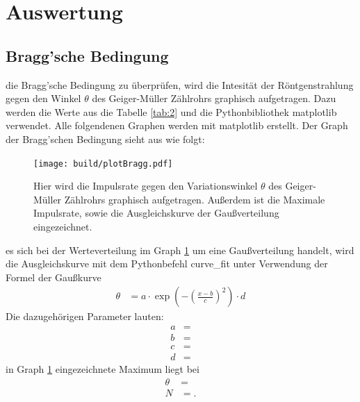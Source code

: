 \section{Auswertung}

\subsection{Bragg'sche Bedingung}

    \justifying die Bragg'sche Bedingung zu überprüfen, wird die Intesität der Röntgenstrahlung gegen den Winkel $\theta$ des
    Geiger-Müller Zählrohrs graphisch aufgetragen. Dazu werden die Werte aus die Tabelle \ref{tab:2} und die Pythonbibliothek matplotlib 
    \cite{matplotlib} verwendet. Alle folgendenen Graphen werden mit matplotlib erstellt. Der Graph der Bragg'schen Bedingung sieht aus wie
    folgt:

    \begin{figure}[H]
        \centering
        \texttt{[image: build/plotBragg.pdf]}
        \caption{Hier wird die Impulsrate gegen den Variationswinkel $\theta$ des Geiger-Müller Zählrohrs graphisch aufgetragen. 
        Außerdem ist die Maximale Impulsrate, sowie die Ausgleichskurve der Gaußverteilung eingezeichnet.}
        \label{fig:2}
    \end{figure}

    \justifying es sich bei der Werteverteilung im Graph \ref{fig:2} um eine Gaußverteilung handelt, wird die Ausgleichskurve 
    mit dem Pythonbefehl curve\_fit \cite{matplotlib} unter Verwendung der Formel der Gaußkurve
    \begin{align}
        \theta &= a\cdot \exp\left(-\left(\frac{x-b}{c}\right)^2\right)\cdot d \label{eq:8}
    \end{align}
    \justifying Die dazugehörigen Parameter lauten:
    \begin{subequations}\label{eq:9}
        \begin{align*}
            a &= \text{}\\
            b &= \text{}\\
            c &= \text{}\\
            d &= \text{}
        \end{align*}
    \end{subequations}
    \justifying in Graph \ref{fig:2} eingezeichnete Maximum liegt bei 
    \begin{subequations}\label{eq:10}
    \begin{align}
        \theta &= \text{} \label{eq:10a}\\
        N &= \text{}. \label{eq:10b}
    \end{align}
    \end{subequations}

